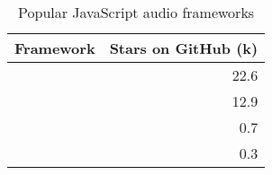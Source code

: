 \begin{table}[ht]
\centering
\caption{Popular JavaScript audio frameworks}
\label{tab:githubAudioFrameworks}
\begin{tabular}[t]{|l|r|}
\toprule
Framework & Stars on GitHub (k)\\
\midrule
\cite{githubHowler} & 22.6\\
\cite{githubToneJs} & 12.9\\
\cite{githubFlocking} & 0.7\\
\cite{githubElementary} & 0.3\\
\bottomrule
\end{tabular}
\end{table}
